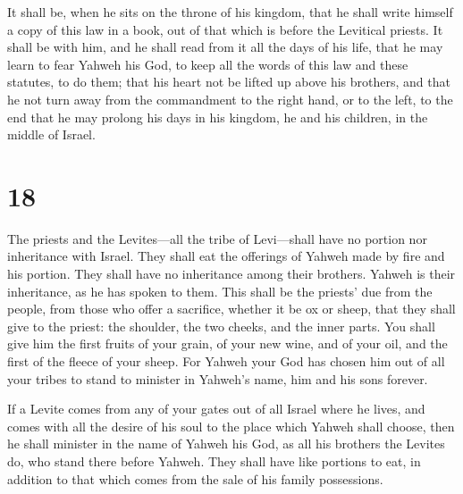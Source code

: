  It shall be, when he sits on the throne of his kingdom,
that he shall write himself a copy of this law in a book, out of that
which is before the Levitical priests.  It shall be with
him, and he shall read from it all the days of his life, that he may
learn to fear Yahweh his God, to keep all the words of this law and
these statutes, to do them;  that his heart not be lifted
up above his brothers, and that he not turn away from the commandment to
the right hand, or to the left, to the end that he may prolong his days
in his kingdom, he and his children, in the middle of Israel.

\hypertarget{section-17}{%
\section{18}\label{section-17}}

 The priests and the Levites---all the tribe of Levi---shall
have no portion nor inheritance with Israel. They shall eat the
offerings of Yahweh made by fire and his portion.  They
shall have no inheritance among their brothers. Yahweh is their
inheritance, as he has spoken to them.  This shall be the
priests' due from the people, from those who offer a sacrifice, whether
it be ox or sheep, that they shall give to the priest: the shoulder, the
two cheeks, and the inner parts.  You shall give him the
first fruits of your grain, of your new wine, and of your oil, and the
first of the fleece of your sheep.  For Yahweh your God has
chosen him out of all your tribes to stand to minister in Yahweh's name,
him and his sons forever.

 If a Levite comes from any of your gates out of all Israel
where he lives, and comes with all the desire of his soul to the place
which Yahweh shall choose,  then he shall minister in the
name of Yahweh his God, as all his brothers the Levites do, who stand
there before Yahweh.  They shall have like portions to eat,
in addition to that which comes from the sale of his family possessions.

